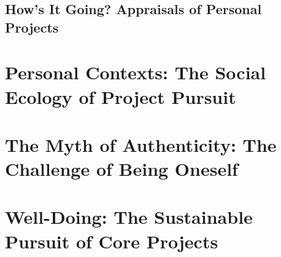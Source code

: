 \documentclass{article}
\numberwithin{equation}{section}
\begin{document}
\subsection{How's It Going? Appraisals of Personal Projects}


\section{Personal Contexts: The Social Ecology of Project Pursuit}


\section{The Myth of Authenticity: The Challenge of Being Oneself}


\section{Well-Doing: The Sustainable Pursuit of Core Projects}


\printbibliography[heading=bibintoc]
	
\end{document}
